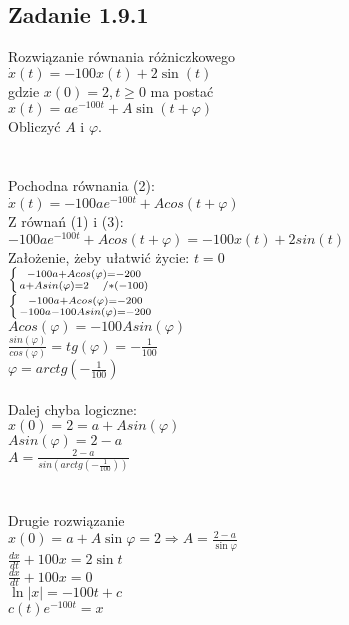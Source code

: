 \pagebreak
\subsection*{Zadanie 1.9.1} {\color{darkgray}
	Rozwiązanie równania różniczkowego\\
	$\dot{x}(t)=-100x(t)+2\sin(t)$\\
	gdzie $x(0)=2, t\geqslant 0$ ma postać\\
	$x(t)=ae^{-100t}+A\sin(t+\varphi)$\\
	Obliczyć $A$ i $\varphi$.\\
}\lineh
\\\\
Pochodna równania (2):\\
$\dot{x}(t) = -100ae^{-100t} + A cos(t + \varphi) $\\
Z równań (1) i (3):\\
$-100ae^{-100t} + A cos(t + \varphi) = -100x(t) + 2sin(t)$\\
Założenie, żeby ułatwić życie: $t = 0$\\
$ \left \{ {{-100a + A cos(\varphi) = -200} \atop {a + A sin(\varphi) = 2} \quad /*(-100)} \right. $\\
$ \left \{ {{-100a + A cos(\varphi) = -200} \atop {-100a -100A sin(\varphi) = -200}} \right. $\\
$A cos(\varphi) = -100A sin(\varphi)$\\
$\frac{sin(\varphi)}{cos(\varphi)} = tg(\varphi) = -\frac{1}{100}$\\
$\varphi = arctg(-\frac{1}{100})$\\
\\
Dalej chyba logiczne:\\
$x(0) = 2 = a + A sin(\varphi)$\\
$A sin(\varphi) = 2-a$\\
$A = \frac{2-a}{sin(arctg(-\frac{1}{100}))}$\\
\lineh
\\\\
{\color{red} Drugie rozwiązanie}\\
$x(0)=a+A\sin \varphi =2 \Rightarrow \boxed{A=\frac{2-a}{\sin \varphi}}$\\
$\frac{dx}{dt}+100x=2\sin t$\\
$\frac{dx}{dt}+100x=0$\\
$\ln|x|=-100t+c$\\
$c(t)e^{-100t}=x$\\

